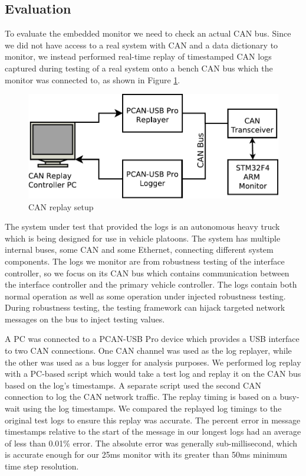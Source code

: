 \documentclass[]{../llncs/llncs}
\begin{document}
\subsection{Evaluation}
\label{sec:eval:embedded}
To evaluate the embedded monitor we need to check an actual CAN bus.  Since we did not have access to a real system with CAN and a data dictionary to monitor, we instead performed real-time replay of timestamped CAN logs captured during testing of a real system onto a bench CAN bus which the monitor was connected to, as shown in Figure \ref{fig:eval:replaySchem}. 

\begin{figure}
\centering
\includegraphics[width=5in]{img/replay_arch}
\caption{CAN replay setup \label{fig:eval:replaySchem}}
\end{figure}
The system under test that provided the logs is an autonomous heavy truck which is being designed for use in vehicle platoons. %
The system has multiple internal buses, some CAN and some Ethernet, connecting different system components. The logs we monitor are from robustness testing of the interface controller, so we focus on its CAN bus which contains communication between the interface controller and the primary vehicle controller.
The logs contain both normal operation as well as some operation under injected robustness testing. During robustness testing, the testing framework can hijack targeted network messages on the bus to inject testing values. %

A PC was connected to a PCAN-USB Pro \cite{PCAN-USBPro} device which provides a USB interface to two CAN connections. One CAN channel was used as the log replayer, while the other was used as a bus logger for analysis purposes.
We performed log replay with a PC-based script which would take a test log and replay it on the CAN bus based on the log's timestamps. A separate script used the second CAN connection to log the CAN network traffic.
The replay timing is based on a busy-wait using the log timestamps. 
We compared the replayed log timings to the original test logs to ensure this replay was accurate. 
The percent error in message timestamps relative to the start of the message in our longest logs had an average of less than 0.01\% error. The absolute error was generally sub-millisecond, which is accurate enough for our 25ms monitor with its greater than 50ms minimum time step resolution.
\end{document}
